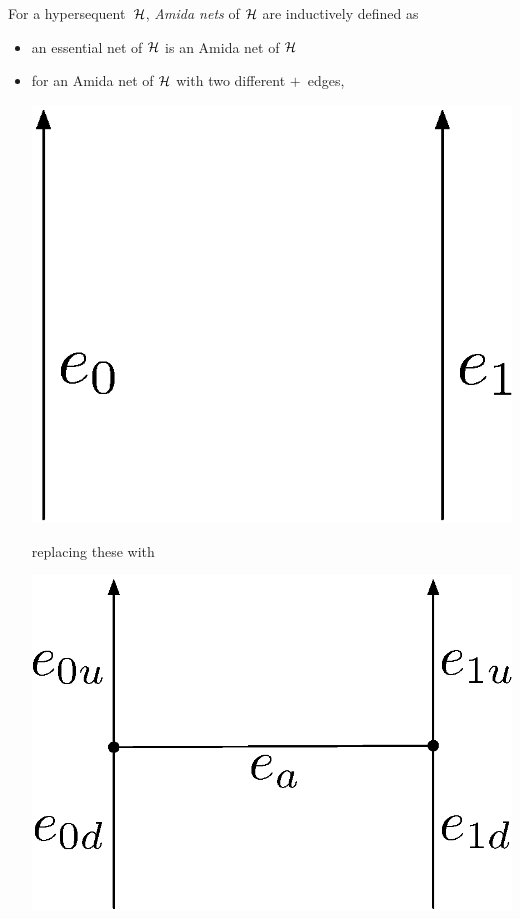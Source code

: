  \begin{definition}
For a hypersequent~$\mathcal{H}$,
\textit{Amida nets} of $\mathcal{H}$ are inductively
  defined as
\begin{itemize}
 \item an essential net of $\mathcal{H}$ is an Amida net of $\mathcal{H}$
 \item for an Amida net of $\mathcal{H}$ with two different $+$~edges,
	\begin{center}
	 \includegraphics[scale=0.4]{twoedges.eps}
	\end{center}
       replacing these with
	\begin{center}
	 \includegraphics[scale=0.4]{twoedges_amida.eps}

\end{center}
\end{itemize}
\end{definition}
